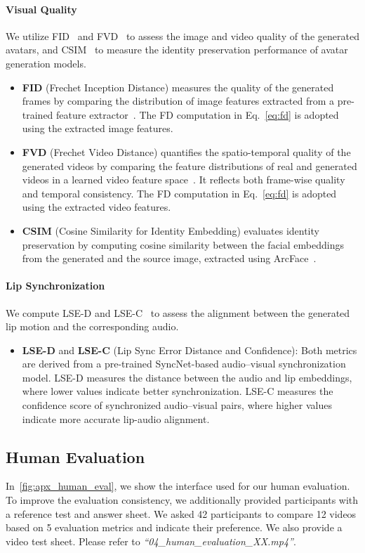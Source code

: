 \paragraph{Visual Quality} We utilize FID~\citep{fid} and FVD~\citep{fvd} to assess the image and video quality of the generated avatars, and CSIM~\citep{arcface} to measure the identity preservation performance of avatar generation models.
\begin{itemize}[leftmargin=1.5em]
\item \textbf{FID} (Frechet Inception Distance) measures the quality of the generated frames by comparing the distribution of image features extracted from a pre-trained feature extractor~\citep{fid}. The FD computation in Eq.~\eqref{eq:fd} is adopted using the extracted image features.
\item \textbf{FVD} (Frechet Video Distance) quantifies the spatio-temporal quality of the generated videos by comparing the feature distributions of real and generated videos in a learned video feature space~\citep{fvd}. It reflects both frame-wise quality and temporal consistency. The FD computation in Eq.~\eqref{eq:fd} is adopted using the extracted video features.
\item \textbf{CSIM} (Cosine Similarity for Identity Embedding) evaluates identity preservation by computing cosine similarity between the facial embeddings from the generated and the source image, extracted using ArcFace~\citep{arcface}.
\end{itemize}

\paragraph{Lip Synchronization} We compute LSE-D and LSE-C~\citep{syncnet} to assess the alignment between the generated lip motion and the corresponding audio.
\begin{itemize}[leftmargin=1.5em]
\item \textbf{LSE-D} and \textbf{LSE-C} (Lip Sync Error Distance and Confidence):
Both metrics are derived from a pre-trained SyncNet-based audio–visual synchronization model. LSE-D measures the distance between the audio and lip embeddings, where lower values indicate better synchronization. LSE-C measures the confidence score of synchronized audio–visual pairs, where higher values indicate more accurate lip-audio alignment.
\end{itemize}

\subsection{Human Evaluation} 
In~\cref{fig:apx_human_eval}, we show the interface used for our human evaluation. To improve the evaluation consistency, we additionally provided participants with a reference test and answer sheet. We asked 42 participants to compare 12 videos based on 5 evaluation metrics and indicate their preference. We also provide a video test sheet. Please refer to \textit{``04\_human\_evaluation\_XX.mp4''}.


